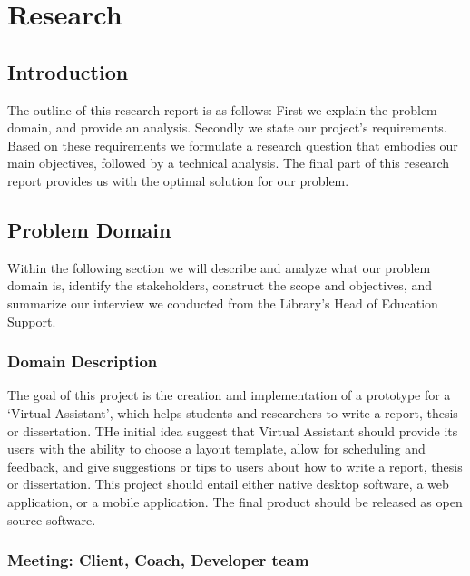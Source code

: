 \chapter{Research}

\section{Introduction}

The outline of this research report is as follows: First we explain the problem domain, and provide an analysis. Secondly we state our project's requirements. Based on these requirements we formulate a research question that embodies our main objectives, followed by a technical analysis. The final part of this research report provides us with the optimal solution for our problem.


\section{Problem Domain} %
\label{sec:problem_domain}


Within the following section we will describe and analyze what our problem domain is, identify the stakeholders, construct the scope and objectives, and summarize our interview we conducted from the Library's Head of Education Support.

\subsection{Domain Description} %
\label{sub:problem_description}

The goal of this project is the creation and implementation of a prototype for a `Virtual Assistant', which helps students and researchers to write a report, thesis or dissertation. THe initial idea suggest that Virtual Assistant should provide its users with the ability to choose a layout template, allow for scheduling and feedback, and give suggestions or tips to users about how to write a report, thesis or dissertation.
This project should entail either native desktop software, a web application, or a mobile application. The final product should be released as open source software.

\subsection{Meeting: Client, Coach, Developer team } %
\label{sub:meeting_client_coach_developer_team_meeting_}

